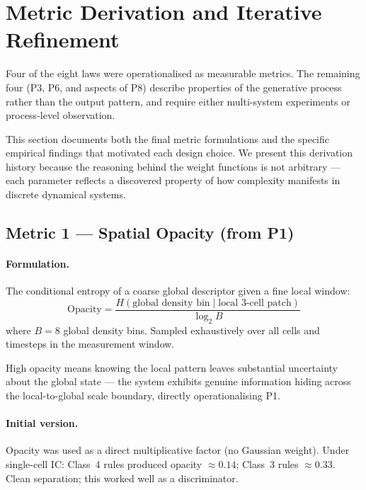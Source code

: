 \documentclass[12pt,a4paper]{article}
\begin{document}
\section{Metric Derivation and Iterative Refinement}

Four of the eight laws were operationalised as measurable metrics.
The remaining four (P3, P6, and aspects of P8) describe properties of the
generative process rather than the output pattern, and require either
multi-system experiments or process-level observation.

This section documents both the final metric formulations and the specific
empirical findings that motivated each design choice.
We present this derivation history because the reasoning behind the weight
functions is not arbitrary --- each parameter reflects a discovered property
of how complexity manifests in discrete dynamical systems.

\subsection{Metric 1 --- Spatial Opacity (from P1)}

\paragraph{Formulation.}
The conditional entropy of a coarse global descriptor given a fine local window:
\begin{equation}
\text{Opacity} = \frac{H(\text{global density bin} \mid \text{local 3-cell patch})}
                      {\log_2 B}
\end{equation}
where $B = 8$ global density bins.
Sampled exhaustively over all cells and timesteps in the measurement window.

High opacity means knowing the local pattern leaves substantial uncertainty
about the global state --- the system exhibits genuine information hiding
across the local-to-global scale boundary, directly operationalising P1.

\paragraph{Initial version.}
Opacity was used as a direct multiplicative factor (no Gaussian weight).
Under single-cell IC: Class~4 rules produced opacity $\approx 0.14$;
Class~3 rules $\approx 0.33$.
Clean separation; this worked well as a discriminator.
\end{document}
